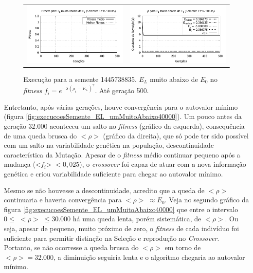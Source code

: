 	\begin{figure}[htbp]
	\centering
  \begin{tabular}{@{}cc@{}}	
		\includegraphics[width=.45\textwidth]{figs/resultados/variandoELSemente/T4_S-1445738835_fitness.pdf} &
    \includegraphics[width=.45\textwidth]{figs/resultados/variandoELSemente/T4_S-1445738835_rho.pdf}
  \end{tabular}
  \caption{Execução para a semente 1445738835. $E_L$ muito abaixo de $E_0$ no \textit{fitness} $f_i = e^{-\lambda(\rho_i - E_L)^2}$. Até geração 500.}
	\label{fig:execucoesSemente_EL_umMuitoAbaixo500}
	\end{figure}
		
	Entretanto, após várias gerações, houve convergência para o autovalor mínimo (figura \ref{fig:execucoesSemente_EL_umMuitoAbaixo40000}). Um pouco antes da geração 32.000 aconteceu um salto no \emph{fitness} (gráfico da esquerda), consequência de uma queda brusca do $<\rho>$ (gráfico da direita), que só pode ter sido possível com um salto na variabilidade genética na população, descontinuidade característica da Mutação. Apesar de o \emph{fitness} médio continuar pequeno após a mudança (<$f_i$> $< 0,025$), o \emph{crossover} foi capaz de atuar com a nova informação genética e criou variabilidade suficiente para chegar ao autovalor mínimo.
	
	Mesmo se não houvesse a descontinuidade, acredito que a queda de $<\rho>$ continuaria e haveria convergência para $<\rho>$ $\approx E_0$. Veja no segundo gráfico da figura \ref{fig:execucoesSemente_EL_umMuitoAbaixo40000} que entre o intervalo $0 \leq$ $<\rho>$ $\leq 30.000$ há uma queda lenta, porém sistemática, de $<\rho>$. Ou seja, apesar de pequeno, muito próximo de zero, o \emph{fitness} de cada indivíduo foi suficiente para permitir distinção na Seleção e reprodução no \emph{Crossover}. Portanto, se não ocorresse a queda brusca do $<\rho>$ em torno de $<\rho> = 32.000$, a diminuição seguiria lenta e o algoritmo chegaria ao autovalor mínimo.
	
